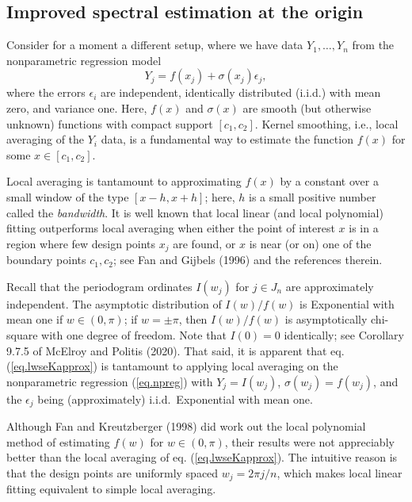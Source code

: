 \documentclass[12p E.Lt,psfig]{article} %
\begin{document}
\subsection{Improved spectral   estimation at the origin}
\label{sec.2.2}

Consider for a moment a different setup,  where we have
data $Y_1, \ldots, Y_n$ from the  nonparametric regression
model
\begin{equation}
 Y_j=f(x_j)+\sigma (x_j) \epsilon_j,
\label{eq.npreg}
\end{equation}
where the errors $\epsilon_i$
are independent, identically distributed (i.i.d.) with mean zero, and variance one.
Here,  $f(x)$ and $\sigma (x)$ are  smooth (but otherwise
unknown) functions with compact  support $[c_1, c_2]$.
Kernel smoothing, i.e., local averaging of the $Y_i$ data, is a fundamental
way to estimate the function $f(x)$ for some  $x\in [c_1, c_2]$.

Local averaging is tantamount to approximating $f(x)$ by a constant over a small
window of the type $[x-h, x+h]$; here, $h$ is a small positive number called the {\it bandwidth}.
It is well known that local linear (and local polynomial) fitting outperforms
local averaging when either the point of interest $x$ is in a region where few
design points $x_j$ are found, or $x$ is near (or on) one of  the boundary points $ c_1, c_2 $;
see Fan and Gijbels  (1996) and the references therein.

Recall that the periodogram ordinates $I(w_j)$ for $j \in  J_n$ are approximately independent.
The   asymptotic distribution of $I(w)/ f(w) $ is Exponential with mean one if $w\in (0,\pi)$;
if $w=\pm \pi$, then $I(w)/ f(w) $ is  asymptotically chi-square with one degree of freedom.
Note that $I(0)=0$ identically; see Corollary 9.7.5 of McElroy and Politis (2020).
That said, it is apparent that eq. (\ref{eq.lwseKapprox}) is tantamount
to applying local averaging on
the nonparametric regression
(\ref{eq.npreg}) with $Y_j= I(w_j)$,  $\sigma (w_j) =f (w_j)$, and
the $\epsilon_j$ being (approximately) i.i.d.~Exponential with mean one.


Although Fan  and Kreutzberger   (1998) did work out the local polynomial method of
estimating $f(w) $  for  $w\in (0,\pi)$, their results were not appreciably better than
the local averaging of eq. (\ref{eq.lwseKapprox}). The intuitive  reason is that the design points
are uniformly spaced $w_j=2\pi j/n$,  which makes local linear fitting equivalent to simple
local averaging.
\end{document}
